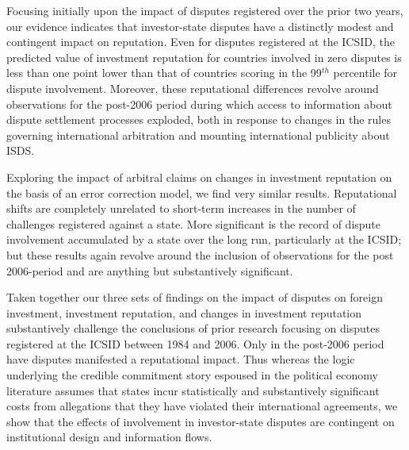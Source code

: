\documentclass[12pt,onesided]{amsart}
\begin{document}
Focusing initially upon the impact of disputes registered over the prior two years, our evidence indicates that investor-state disputes have a distinctly modest and contingent impact on reputation. Even for disputes registered at the ICSID, the predicted value of investment reputation for countries involved in zero disputes is less than one point lower than that of countries scoring in the 99$^{th}$ percentile for dispute involvement. Moreover, these reputational differences revolve around observations for the post-2006 period during which access to information about dispute settlement processes exploded, both in response to changes in the rules governing international arbitration and mounting international publicity about ISDS. 

Exploring the impact of arbitral claims on changes in investment reputation on the basis of an error correction model, we find very similar results. Reputational shifts are completely unrelated to short-term increases in the number of challenges registered against a state. More significant is the record of dispute involvement accumulated by a state over the long run, particularly at the ICSID; but these results again revolve around the inclusion of observations for the post 2006-period and are anything but substantively significant.

Taken together our three sets of findings on the impact of disputes on foreign investment, investment reputation, and changes in investment reputation substantively challenge the conclusions of prior research focusing on disputes registered at the ICSID between 1984 and 2006. Only in the post-2006 period have disputes manifested a reputational impact. Thus whereas the logic underlying the credible commitment story espoused in the political economy literature assumes that states incur statistically and substantively significant costs from allegations that they have violated their international agreements, we show that the effects of involvement in investor-state disputes are contingent on institutional design and information flows.
\end{document}
